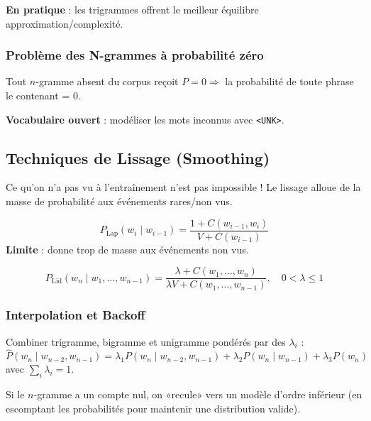 \documentclass[a4paper,10pt]{article}
\begin{document}
\textbf{En pratique} : les trigrammes offrent le meilleur équilibre approximation/complexité.

\subsubsection{Problème des N-grammes à probabilité zéro}
Tout $n$-gramme absent du corpus reçoit $P = 0 \Rightarrow$ la probabilité de toute phrase le contenant = 0.

\textbf{Vocabulaire ouvert} : modéliser les mots inconnus avec \texttt{<UNK>}.

\subsection{Techniques de Lissage (Smoothing)}

\begin{warningbox}
Ce qu'on n'a pas vu à l'entraînement n'est pas impossible ! Le lissage alloue de la masse de probabilité aux événements rares/non vus.
\end{warningbox}

\begin{formulebox}
\[
P_{\text{Lap}}(w_i \mid w_{i-1}) = \frac{1 + C(w_{i-1}, w_i)}{V + C(w_{i-1})}
\]
\textbf{Limite} : donne trop de masse aux événements non vus.
\end{formulebox}

\begin{formulebox}
\[
P_{\text{Lid}}(w_n \mid w_1, \ldots, w_{n-1}) = \frac{\lambda + C(w_1, \ldots, w_n)}{\lambda V + C(w_1, \ldots, w_{n-1})}, \quad 0 < \lambda \leq 1
\]
\end{formulebox}

\subsubsection{Interpolation et Backoff}

\begin{definitionbox}
Combiner trigramme, bigramme et unigramme pondérés par des $\lambda_i$ :
\[
\hat{P}(w_n \mid w_{n-2}, w_{n-1}) = \lambda_1 P(w_n \mid w_{n-2}, w_{n-1}) + \lambda_2 P(w_n \mid w_{n-1}) + \lambda_3 P(w_n)
\]
avec $\sum_i \lambda_i = 1$.
\end{definitionbox}

\begin{definitionbox}
Si le $n$-gramme a un compte nul, on «recule» vers un modèle d'ordre inférieur (en escomptant les probabilités pour maintenir une distribution valide).
\end{definitionbox}
\end{document}
